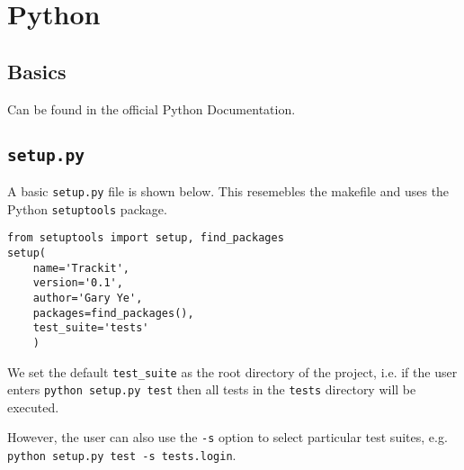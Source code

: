 \documentclass[../main/main.tex]{subfiles}
\begin{document}
\section{Python}

\subsection{Basics}

Can be found in the official Python Documentation. 

\subsection{\lstinline|setup.py|}

A basic \lstinline|setup.py| file is shown below. This resemebles the makefile
and uses the Python \lstinline|setuptools| package. 

\begin{lstlisting}
from setuptools import setup, find_packages
setup(
    name='Trackit',
    version='0.1',
    author='Gary Ye',
    packages=find_packages(),
    test_suite='tests'
    )
\end{lstlisting}

We set the default \lstinline|test_suite| as the root directory of the project,
i.e. if the user enters \lstinline|python setup.py test| then all tests in the
\lstinline|tests| directory will be executed. 

However, the user can also use the \lstinline|-s| option to select particular
test suites, e.g. \lstinline|python setup.py test -s tests.login|. 
\end{document}

